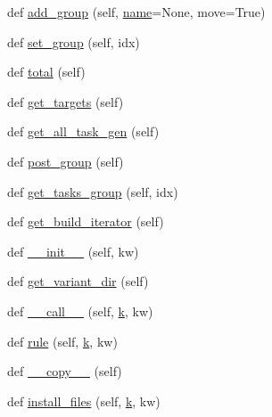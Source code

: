 \begin{DoxyCompactItemize}
def \hyperlink{classwaflib_1_1_build_1_1_build_context_a9e1a6200ab3e854ecc9041a5e9abaa78}{add\+\_\+group} (self, \hyperlink{lib_2expat_8h_a1b49b495b59f9e73205b69ad1a2965b0}{name}=None, move=True)
\item 
def \hyperlink{classwaflib_1_1_build_1_1_build_context_a00550c82b40990a204a19c29aee9bfe6}{set\+\_\+group} (self, idx)
\item 
def \hyperlink{classwaflib_1_1_build_1_1_build_context_a9242bac9596041fb6e91bd4f7cdbac51}{total} (self)
\item 
def \hyperlink{classwaflib_1_1_build_1_1_build_context_a11f1e63e72833ad88c0d58ffb29342d6}{get\+\_\+targets} (self)
\item 
def \hyperlink{classwaflib_1_1_build_1_1_build_context_a534cef50b471df8c60a8392209465f7f}{get\+\_\+all\+\_\+task\+\_\+gen} (self)
\item 
def \hyperlink{classwaflib_1_1_build_1_1_build_context_ae2c4605b1c701d8421f922205621f9df}{post\+\_\+group} (self)
\item 
def \hyperlink{classwaflib_1_1_build_1_1_build_context_a24789de45b2753c05b4a972ea7788dda}{get\+\_\+tasks\+\_\+group} (self, idx)
\item 
def \hyperlink{classwaflib_1_1_build_1_1_build_context_a7a7c250dce7990bdebc5d1d58047139a}{get\+\_\+build\+\_\+iterator} (self)
\item 
def \hyperlink{classwaflib_1_1_build_1_1_build_context_a04e1b540edfafc14247ff272cb62e604}{\+\_\+\+\_\+init\+\_\+\+\_\+} (self, kw)
\item 
def \hyperlink{classwaflib_1_1_build_1_1_build_context_acc99340a3386e41dc8d7b6b677db0536}{get\+\_\+variant\+\_\+dir} (self)
\item 
def \hyperlink{classwaflib_1_1_build_1_1_build_context_ad658b3ed93230daaed1fd1d25488df4b}{\+\_\+\+\_\+call\+\_\+\+\_\+} (self, \hyperlink{rfft2d_test_m_l_8m_adc468c70fb574ebd07287b38d0d0676d}{k}, kw)
\item 
def \hyperlink{classwaflib_1_1_build_1_1_build_context_a46943e460fe05c7285a5e14154afab6c}{rule} (self, \hyperlink{rfft2d_test_m_l_8m_adc468c70fb574ebd07287b38d0d0676d}{k}, kw)
\item 
def \hyperlink{classwaflib_1_1_build_1_1_build_context_a4a0f871a711f02e9b65210633a14c6c2}{\+\_\+\+\_\+copy\+\_\+\+\_\+} (self)
\item 
def \hyperlink{classwaflib_1_1_build_1_1_build_context_ae579a92fd181e2d51337b641cb153439}{install\+\_\+files} (self, \hyperlink{rfft2d_test_m_l_8m_adc468c70fb574ebd07287b38d0d0676d}{k}, kw)
\item 

\end{DoxyCompactItemize}
